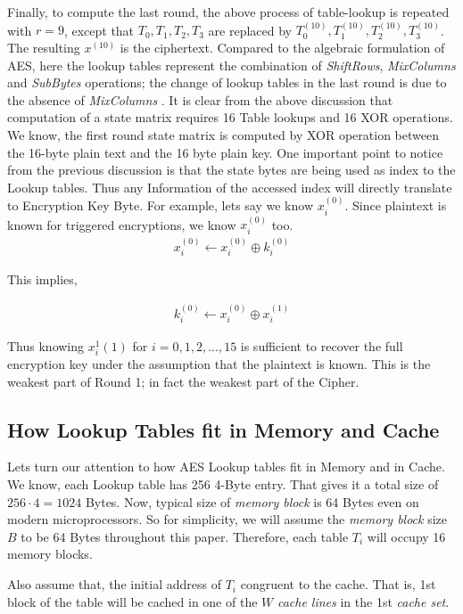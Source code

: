 Finally, to compute the last round, the above process of table-lookup is repeated with $r=9$, except that $T_0,T_1,T_2,T_3$ are replaced by $T_0^{(10)},T_1^{(10)},T_2^{(10)},T_3^{(10)}$. The resulting $x^{(10)}$ is the ciphertext. Compared to the algebraic formulation of AES, here the lookup tables represent the combination of \emph{ShiftRows}, \emph{MixColumns} and \emph{SubBytes} operations; the change of lookup tables in the last round is due to the absence of \emph{MixColumns} \citep{osvik}. It is clear from the above discussion that computation of a state matrix requires 16 Table lookups and 16 XOR operations.\\

We know, the first round state matrix is computed by XOR operation between the 16-byte plain text and the 16 byte plain key. One important point to notice from the previous discussion is that the state bytes are being used as index to the Lookup tables. Thus any Information of the accessed index will directly translate to Encryption Key Byte. For example, lets say we know $x_i^{(0)}$. Since plaintext is known for triggered encryptions, we know $x_i^{(0)}$ too.\\

\begin{align*}
x_i^{(0)} \gets x_i^{(0)} \oplus k_i^{(0)}
\end{align*}

\begin{flushleft}
This implies,
\end{flushleft}
\begin{align*}
k_i^{(0)} \gets x_i^{(0)} \oplus x_i^{(1)}
\end{align*}

\begin{flushleft}
Thus knowing $x_i^1{(1)}$ for $i=0,1,2,...,15$ is sufficient to recover the full encryption key under the assumption that the plaintext is known. This is the weakest part of Round 1; in fact the weakest part of the Cipher.
\end{flushleft}

\subsection{How Lookup Tables fit in Memory and Cache}

Lets turn our attention to how AES Lookup tables fit in Memory and in Cache. We know, each Lookup table has 256 4-Byte entry. That gives it a total size of $256 \cdot 4=1024$ Bytes. Now, typical size of \emph{memory block} is 64 Bytes even on modern microprocessors. So for simplicity, we will assume the \emph{memory block} size $B$ to be 64 Bytes throughout this paper. Therefore, each table $T_i$ will occupy 16 memory blocks.

\begin{flushleft}
Also assume that, the initial address of $T_i$ congruent to the cache. That is, 1st block of the table will be cached in one of the $W$ \emph{cache lines} in the 1st \emph{cache set}.
\end{flushleft}
